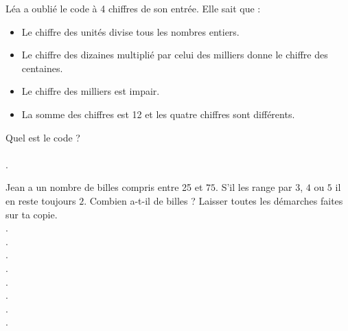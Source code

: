 \documentclass[a4paper]{article}
\begin{document}
\begin{question}[(2,5 points)]
	Léa a oublié le code à 4 chiffres de son entrée. Elle sait que :
	\begin{itemize}
		\setlength\itemsep{0.3em}
		\item[] Le chiffre des unités divise tous les nombres entiers.
		\item[] Le chiffre des dizaines multiplié par celui des milliers donne le chiffre des centaines.
		\item[] Le chiffre des milliers est impair.
		\item[] La somme des chiffres est 12 et les quatre chiffres sont différents.
	\end{itemize}

	Quel est le code ? \\ \\
	.\dotfill
\end{question}

\begin{question}[(2,5 points)]
	Jean a un nombre de billes compris entre 25 et $75$. S’il les range par $3$, $4$ ou $5$ il en reste toujours $2$. Combien a-t-il de billes ? Laisser toutes les démarches faites sur ta copie. \\[0.5cm]
	.\dotfill \\[0.5cm]
	.\dotfill \\[0.5cm]
	.\dotfill \\[0.5cm]
	.\dotfill \\[0.5cm]
	.\dotfill \\[0.5cm]
	.\dotfill \\[0.5cm]
	.\dotfill \\[0.5cm]
	.\dotfill
\end{question}
\end{document}
